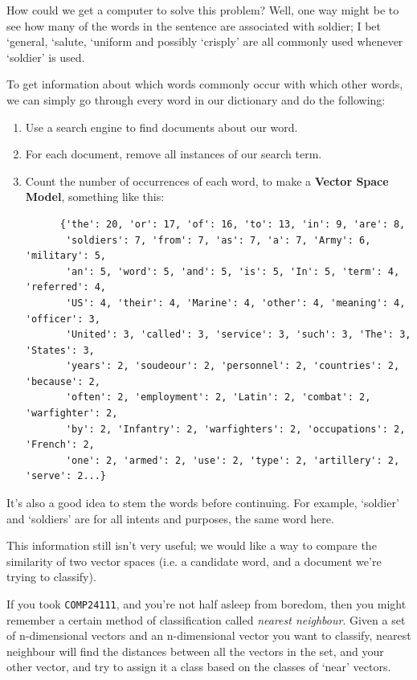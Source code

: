 How could we get a computer to solve this problem? Well, one way might be to see
how many of the words in the sentence are associated with soldier; I bet
`general, `salute, `uniform and possibly `crisply' are all commonly used
whenever `soldier' is used.

To get information about which words commonly occur with which other words, we
can simply go through every word in our dictionary and do the following:

\begin{enumerate}
  \item Use a search engine to find documents about our word.
  \item For each document, remove all instances of our search term.
  \item Count the number of occurrences of each word, to make a \textbf{Vector 
    Space Model}, something like this:
    \begin{verbatim}
      {'the': 20, 'or': 17, 'of': 16, 'to': 13, 'in': 9, 'are': 8,
       'soldiers': 7, 'from': 7, 'as': 7, 'a': 7, 'Army': 6, 'military': 5,
       'an': 5, 'word': 5, 'and': 5, 'is': 5, 'In': 5, 'term': 4, 'referred': 4,
       'US': 4, 'their': 4, 'Marine': 4, 'other': 4, 'meaning': 4, 'officer': 3,
       'United': 3, 'called': 3, 'service': 3, 'such': 3, 'The': 3, 'States': 3,
       'years': 2, 'soudeour': 2, 'personnel': 2, 'countries': 2, 'because': 2,
       'often': 2, 'employment': 2, 'Latin': 2, 'combat': 2, 'warfighter': 2,
       'by': 2, 'Infantry': 2, 'warfighters': 2, 'occupations': 2, 'French': 2,
       'one': 2, 'armed': 2, 'use': 2, 'type': 2, 'artillery': 2, 'serve': 2...}
    \end{verbatim}
\end{enumerate}

It's also a good idea to stem the words before continuing. For example,
`soldier' and `soldiers' are for all intents and purposes, the same word here.

This information still isn't very useful; we would like a way to compare the
similarity of two vector spaces (i.e. a candidate word, and a document we're
trying to classify).

If you took \texttt{COMP24111}, and you're not half asleep from boredom, then
you might remember a certain method of classification called \textit{nearest
neighbour}. Given a set of n-dimensional vectors and an n-dimensional vector you
want to classify, nearest neighbour will find the distances between all the
vectors in the set, and your other vector, and try to assign it a class based on
the classes of `near' vectors.


